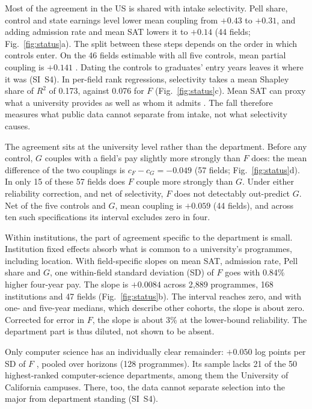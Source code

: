 Most of the agreement in the US is shared with intake selectivity. Pell share, control and state earnings level
lower mean coupling from $+0.43$ to $+0.31$, and adding admission rate and mean SAT lowers it to $+0.14$ (44 fields;
Fig.~\ref{fig:status}a). The split between these steps depends on the order in which controls enter. On the 46
fields estimable with all five controls, mean partial coupling is $+0.141$ . Dating the controls
to graduates' entry years leaves it where it was (SI~S4). In per-field rank regressions, selectivity takes a mean
Shapley share of $R^2$ of 0.173, against 0.076 for $F$ (Fig.~\ref{fig:status}c). Mean SAT can proxy what a
university provides as well as whom it admits \citep{dale2002estimating}. The fall therefore measures what public
data cannot separate from intake, not what selectivity causes.

The agreement sits at the university level rather than the department. Before any control, $G$ couples with a
field's pay slightly more strongly than $F$ does: the mean difference of the two couplings is $c_F-c_G=-0.049$
 (57 fields; Fig.~\ref{fig:status}d). In only 15 of these 57 fields does $F$ couple more strongly
than $G$. Under either reliability correction, and net of selectivity, $F$ does not detectably out-predict $G$. Net
of the five controls and $G$, mean coupling is $+0.059$  (44 fields), and across ten such
specifications its interval excludes zero in four.

Within institutions, the part of agreement specific to the department is small. Institution fixed effects absorb
what is common to a university's programmes, including location. With field-specific slopes on mean SAT, admission
rate, Pell share and $G$, one within-field standard deviation (SD) of $F$ goes with 0.84\% higher four-year pay. The
slope is $+0.0084$  across 2,889 programmes, 168 institutions and 47 fields
(Fig.~\ref{fig:status}b). The interval reaches zero, and with one- and five-year medians, which describe other
cohorts, the slope is about zero. Corrected for error in $F$, the slope is about 3\% at the lower-bound reliability.
The department part is thus diluted, not shown to be absent.

Only computer science has an individually clear remainder: $+0.050$ log points per SD of $F$ ,
pooled over horizons (128 programmes). Its sample lacks 21 of the 50 highest-ranked computer-science departments,
among them the University of California campuses. There, too, the data cannot separate selection into the major
\citep{bleemer2022will} from department standing (SI~S4).

